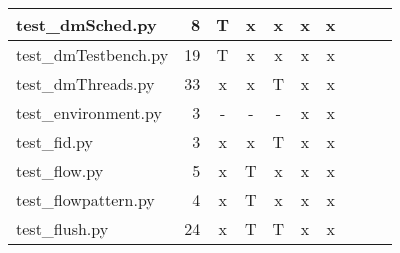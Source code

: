 \documentclass[12pt,a4paper]{report}
\begin{document}
\begin{table}
\begin{tabular}[t]{|l|r|c|c|c|c|c|c|c|c|}
test\_dmSched.py                        &  8                  &   T        &   x             &   x           &   x              &   x                 \\ \hline
test\_dmTestbench.py                    &  19                 &   T        &   x             &   x           &   x              &   x                 \\ \hline
test\_dmThreads.py                      &  33                 &   x        &   x             &   T           &   x              &   x                 \\ \hline
test\_environment.py                    &  3                  &   -        &   -             &   -           &   x              &   x                 \\ \hline
test\_fid.py                            &  3                  &   x        &   x             &   T           &   x              &   x                 \\ \hline
test\_flow.py                           &  5                  &   x        &   T             &   x           &   x              &   x                 \\ \hline
test\_flowpattern.py                    &  4                  &   x        &   T             &   x           &   x              &   x                 \\ \hline
test\_flush.py                          &  24                 &   x        &   T             &   T           &   x              &   x                 \\ \hline
\end{tabular}
\end{table}
\end{document}
